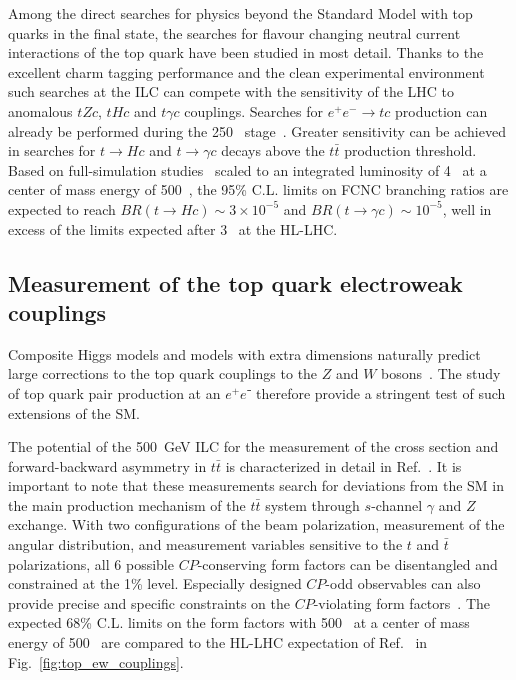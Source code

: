 Among the direct searches for physics beyond the Standard Model with top quarks 
in the final state, the searches for flavour changing neutral current interactions of 
the top quark have been studied in most detail. Thanks to the excellent charm
tagging performance and the clean experimental environment such searches at the ILC
can compete with the sensitivity of the LHC to anomalous $ t Z c$, $t H c$ and 
$t\gamma c$ couplings. Searches for $e^+e^- \rightarrow t c$ production can
already be performed during the 250~\GeV{} stage~\cite{Hesari:2014eua}. Greater sensitivity can be achieved in searches for $t \rightarrow Hc$ and 
$t\rightarrow \gamma c$ decays above the $t\bar{t}$ production threshold.
Based on full-simulation studies~\cite{Zarnecki:2018wsw, Abramowicz:2018rjq} 
scaled to an integrated luminosity of 4~\iab{} 
at a center of mass energy of 500~\GeV{}{}, the 95\% C.L. limits on FCNC branching
ratios are expected to reach $BR(t \rightarrow Hc) \sim 3 \times 10^{-5}$ and 
$BR(t \rightarrow \gamma c) \sim 10^{-5}$, well in excess of the 
limits expected after 3~\iab{} at the HL-LHC. 


\subsection{Measurement of the top quark electroweak couplings}
\label{subsec:top:topelectroweak}

Composite Higgs models and models with extra dimensions naturally
predict  large corrections to the top quark couplings to the $Z$ and
$W$ bosons~\cite{Richard:2014upa,Barducci:2015aoa,Durieux:2018ekg}.
The study of top quark pair production at an $e^+e⁻$ therefore provide
a stringent test of such extensions of the SM.

The potential of the 500~GeV ILC for the measurement of the cross section and forward-backward asymmetry in
$t\bar{t}$ is characterized in detail in Ref.~\cite{Amjad:2015mma}. It
is important to note that these measurements search for deviations
from the SM in the main production mechanism of the $t\bar t$ system
through $s$-channel $\gamma$ and $Z$ exchange.   With two
configurations of the beam polarization, measurement of the angular
distribution, and measurement variables sensitive to the $t$ and $\bar
t$ polarizations, all 6 possible $CP$-conserving form factors can be
disentangled and constrained at the 1\% level. 
Especially designed $CP$-odd observables can also provide precise and
specific constraints on the $CP$-violating form factors~\cite{Bernreuther:2017cyi}. 
The expected 68\% C.L. limits on the form factors with 500~\ifb{} at
a center of mass energy of 500~\GeV{} are compared to the HL-LHC
expectation of Ref.~\cite{Baur:2004uw,Baur:2005wi} in Fig.~\ref{fig:top_ew_couplings}.

